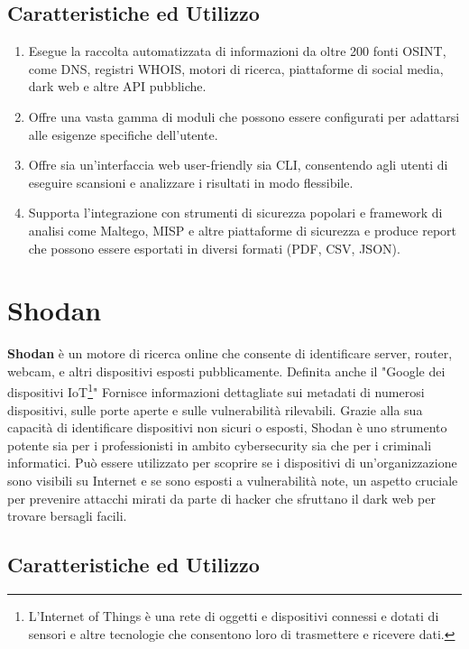 \subsection{Caratteristiche ed Utilizzo}\label{subsec:es_subsec_tool3}

\begin{enumerate}
    \item Esegue la raccolta automatizzata di informazioni da oltre 200 fonti OSINT, come DNS, registri WHOIS, motori di ricerca, piattaforme di social media, dark web e altre API pubbliche.
    \item Offre una vasta gamma di moduli che possono essere configurati per adattarsi alle esigenze specifiche dell'utente.
    \item Offre sia un'interfaccia web user-friendly sia CLI, consentendo agli utenti di eseguire scansioni e analizzare i risultati in modo flessibile.
    \item Supporta l'integrazione con strumenti di sicurezza popolari e framework di analisi come Maltego, MISP e altre piattaforme di sicurezza e produce report che possono essere esportati in diversi formati (PDF, CSV, JSON).
\end{enumerate}


\section{Shodan}\label{sec:cap_sec_tool4}

\textbf{Shodan} è un motore di ricerca online che consente di identificare server, router, webcam, e altri dispositivi esposti pubblicamente. Definita anche il "Google dei dispositivi IoT\footnote{L'Internet of Things è una rete di oggetti e dispositivi connessi e dotati di sensori e altre tecnologie che consentono loro di trasmettere e ricevere dati.}" Fornisce informazioni dettagliate sui metadati di numerosi dispositivi, sulle porte aperte e sulle vulnerabilità rilevabili. Grazie alla sua capacità di identificare dispositivi non sicuri o esposti, Shodan è uno strumento potente sia per i professionisti in ambito cybersecurity sia che per i criminali informatici. Può essere utilizzato per scoprire se i dispositivi di un'organizzazione sono visibili su Internet e se sono esposti a vulnerabilità note, un aspetto cruciale per prevenire attacchi mirati da parte di hacker che sfruttano il dark web per trovare bersagli facili.

\subsection{Caratteristiche ed Utilizzo}\label{subsec:es_subsec_tool4}

